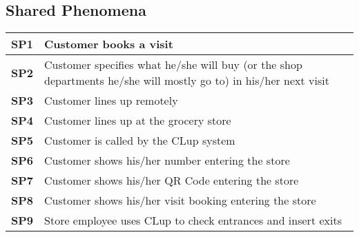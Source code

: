 \subsection{Shared Phenomena}
\begin{center}
    {\renewcommand{\arraystretch}{2}
    \begin{tabular}{L{2cm}L{12cm}}
        \hline
        \textbf{SP1} & Customer books a visit \\
        \hline
        \textbf{SP2} & Customer specifies what he/she will buy (or the shop departments he/she will mostly go to) in his/her next visit \\
        \hline
        \textbf{SP3} & Customer lines up remotely \\
        \hline
        \textbf{SP4} & Customer lines up at the grocery store \\
        \hline
        \textbf{SP5} & Customer is called by the CLup system \\
        \hline
        \textbf{SP6} & Customer shows his/her number entering the store \\
        \hline
        \textbf{SP7} & Customer shows his/her QR Code entering the store \\
        \hline
        \textbf{SP8} & Customer shows his/her visit booking entering the store \\
        \hline
        \textbf{SP9} & Store employee uses CLup to check entrances and insert exits \\
        \hline
    \end{tabular}}
\end{center}

